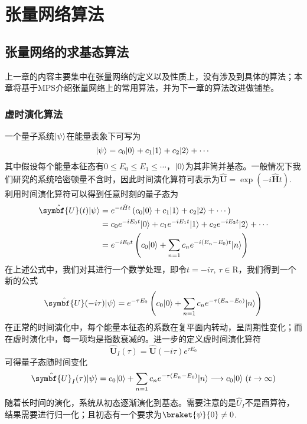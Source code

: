 
\chapter{张量网络算法}

\section{张量网络的求基态算法}

上一章的内容主要集中在张量网络的定义以及性质上，没有涉及到具体的算法；本章将基于MPS介绍张量网络上的常用算法，并为下一章的算法改进做铺垫。

\subsection{虚时演化算法}

一个量子系统$\lvert\psi\rangle$在能量表象下可写为
\begin{equation}
\lvert\psi\rangle = c_0\lvert0\rangle + c_1\lvert1\rangle + c_2\lvert2\rangle + \cdots
\end{equation}
其中假设每个能量本征态有$0\leq E_0\leq E_1\leq \cdots$，$\lvert0\rangle$为其非简并基态。一般情况下我们研究的系统哈密顿量不含时，因此时间演化算符可表示为$\hat{\symbf{U}} = \exp\left(-i\hat{\symbf{H}}t\right)$. 利用时间演化算符可以得到任意时刻的量子态为
\begin{align}
\hat{\symbf{U}}(t)\ket{\psi} &= e^{-i\hat{H}t}\left(c_0 \ket{0} + c_1\ket{1} + c_2\ket{2} + \cdots\right)\\
		&= c_0 e^{-iE_0 t}\ket{0} + c_1 e^{-iE_1 t}\ket{1} + c_2 e^{-iE_2 t}\ket{2} + \cdots\\
		&= e^{-iE_0 t}\left( c_0\ket{0} + \sum_{n=1}c_n e^{-i(E_n-E_0)t}\ket{n} \right)
\end{align}
在上述公式中，我们对其进行一个数学处理，即令$t=-i\tau,\,\tau\in\mathrm{R}$，我们得到一个新的公式
\begin{equation}
\hat{\symbf{U}}(-i\tau)\ket{\psi} =  e^{-\tau E_0}\left( c_0\ket{0} + \sum_{n=1}c_n e^{-\tau(E_n-E_0)}\ket{n} \right)
\end{equation}
在正常的时间演化中，每个能量本征态的系数在复平面内转动，呈周期性变化；而在虚时演化中，每一项均是指数衰减的。进一步的定义虚时间演化算符
\begin{equation}
\hat{\symbf{U}}_I(\tau) = \hat{\symbf{U}}(-i\tau)e^{\tau E_0}
\end{equation}
可得量子态随时间变化
\begin{equation}
\hat{\symbf{U}}_I(\tau)\ket{\psi} = c_0\ket{0} + \sum_{n=1}c_n e^{-\tau(E_n-E_0)}\ket{n} \longrightarrow c_0\ket{0}\;(t\to\infty)
\end{equation}
随着长时间的演化，系统从初态逐渐演化到基态。需要注意的是$\hat{U}_I$不是酉算符，结果需要进行归一化；且初态有一个要求为$\braket{\psi}{0}\neq 0$.

